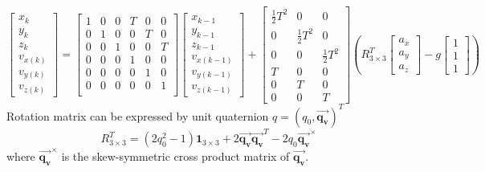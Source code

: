 \documentclass{cisXXX} %
\begin{document}
\begin{equation}
\begin{bmatrix}
x_k \\
y_k \\
z_k \\
v_{x(k)} \\
v_{y(k)} \\
v_{z(k)} 
\end{bmatrix}=\begin{bmatrix}
1  & 0  & 0  & T  & 0  & 0 \\
0  & 1  & 0  & 0  & T  & 0 \\
0  & 0  & 1  & 0  & 0  & T \\
0  & 0  & 0  & 1  & 0  & 0 \\
0  & 0  & 0  & 0  & 1  & 0 \\
0  & 0  & 0  & 0  & 0  & 1 \\
\end{bmatrix}
\begin{bmatrix}
x_{k-1} \\
y_{k-1} \\
z_{k-1} \\
v_{x(k-1)} \\
v_{y(k-1)} \\
v_{z(k-1)} 
\end{bmatrix}+\begin{bmatrix}
\frac{1}{2}T^2  & 0     & 0   \\
0      &\frac{1}{2}T^2  & 0   \\
0      & 0  & \frac{1}{2}T^2  \\
T      & 0              & 0   \\
0      & T              & 0   \\
0      & 0              & T
\end{bmatrix}\left( R^T_{3\times3}\begin{bmatrix}
a_x  \\
a_y  \\
a_z
\end{bmatrix}-g\begin{bmatrix}
1  \\
1  \\
1
\end{bmatrix}
\right)
\end{equation}
Rotation matrix can be expressed by unit quaternion $q=(q_0, \bm{\vec{q_v}})^T$
$$
R^T_{3\times3}=(2q_0^2-1)\bm{1}_{3\times3}+2\bm{\vec{q_v}}\bm{\vec{q_v}}^T-2q_0\bm{\vec{q_v}}^{\times}
$$
where $\bm{\vec{q_v}}^{\times}$ is the skew-symmetric cross product matrix of $\bm{\vec{q_v}}$.
\end{document}
